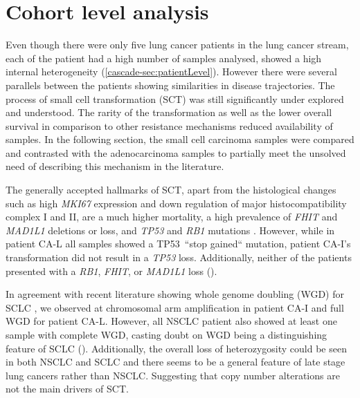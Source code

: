 

\section{Cohort level analysis}
\label{cascade-sec:cohortLevel}

Even though there were only five lung cancer patients in the lung cancer stream, each of the patient had a high number of samples analysed, showed a high internal heterogeneity (\autoref{cascade-sec:patientLevel}). However there were several parallels between the patients showing similarities in disease trajectories. The process of small cell transformation (SCT) was still significantly under explored and understood. The rarity of the transformation as well as the lower overall survival in comparison to other resistance mechanisms reduced availability of samples. In the following section, the small cell carcinoma samples were compared and contrasted with the adenocarcinoma samples to partially meet the unsolved need of describing this mechanism in the literature.

The generally accepted hallmarks of SCT, apart from the histological changes such as high \textit{MKI67} expression and down regulation of major histocompatibility complex I and II, are a much higher mortality, a high prevalence of \textit{FHIT} and \textit{MAD1L1} deletions or loss, and \textit{TP53} and \textit{RB1} mutations \cite{Meerbeeck2011,Raso2021}. However, while in patient CA-L all samples showed a TP53~``stop gained`` mutation, patient CA-I's transformation did not result in a \textit{TP53} loss. Additionally, neither of the patients presented with a \textit{RB1}, \textit{FHIT}, or \textit{MAD1L1} loss (). 

In agreement with recent literature showing whole genome doubling (WGD) for SCLC \cite{Zhou2021}, we observed at chromosomal arm amplification in patient CA-I and full WGD for patient CA-L. However, all NSCLC patient also showed at least one sample with complete WGD, casting doubt on WGD being a distinguishing feature of SCLC (). Additionally, the overall loss of heterozygosity could be seen in both NSCLC and SCLC and there seems to be a general feature of late stage lung cancers rather than NSCLC. Suggesting that copy number alterations are not the main drivers of SCT.

